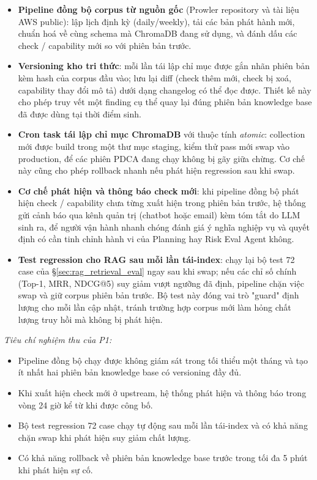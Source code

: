 \begin{itemize}
  \item \textbf{Pipeline đồng bộ corpus từ nguồn gốc} (Prowler repository và tài liệu AWS public): lập lịch định kỳ (daily/weekly), tải các bản phát hành mới, chuẩn hoá về cùng schema mà ChromaDB đang sử dụng, và đánh dấu các check / capability mới so với phiên bản trước.

  \item \textbf{Versioning kho tri thức}: mỗi lần tái lập chỉ mục được gắn nhãn phiên bản kèm hash của corpus đầu vào; lưu lại diff (check thêm mới, check bị xoá, capability thay đổi mô tả) dưới dạng changelog có thể đọc được. Thiết kế này cho phép truy vết một finding cụ thể quay lại đúng phiên bản knowledge base đã được dùng tại thời điểm sinh.

  \item \textbf{Cron task tái lập chỉ mục ChromaDB} với thuộc tính \emph{atomic}: collection mới được build trong một thư mục staging, kiểm thử pass mới swap vào production, để các phiên PDCA đang chạy không bị gãy giữa chừng. Cơ chế này cũng cho phép rollback nhanh nếu phát hiện regression sau khi swap.

  \item \textbf{Cơ chế phát hiện và thông báo check mới}: khi pipeline đồng bộ phát hiện check / capability chưa từng xuất hiện trong phiên bản trước, hệ thống gửi cảnh báo qua kênh quản trị (chatbot hoặc email) kèm tóm tắt do LLM sinh ra, để người vận hành nhanh chóng đánh giá ý nghĩa nghiệp vụ và quyết định có cần tinh chỉnh hành vi của Planning hay Risk Eval Agent không.

  \item \textbf{Test regression cho RAG sau mỗi lần tái-index}: chạy lại bộ test 72 case của §\ref{sec:rag_retrieval_eval} ngay sau khi swap; nếu các chỉ số chính (Top-1, MRR, NDCG@5) suy giảm vượt ngưỡng đã định, pipeline chặn việc swap và giữ corpus phiên bản trước. Bộ test này đóng vai trò "guard" định lượng cho mỗi lần cập nhật, tránh trường hợp corpus mới làm hỏng chất lượng truy hồi mà không bị phát hiện.
\end{itemize}

\noindent\textit{Tiêu chí nghiệm thu của P1:}
\begin{itemize}
  \item Pipeline đồng bộ chạy được không giám sát trong tối thiểu một tháng và tạo ít nhất hai phiên bản knowledge base có versioning đầy đủ.
  \item Khi xuất hiện check mới ở upstream, hệ thống phát hiện và thông báo trong vòng 24 giờ kể từ khi được công bố.
  \item Bộ test regression 72 case chạy tự động sau mỗi lần tái-index và có khả năng chặn swap khi phát hiện suy giảm chất lượng.
  \item Có khả năng rollback về phiên bản knowledge base trước trong tối đa 5 phút khi phát hiện sự cố.
\end{itemize}


